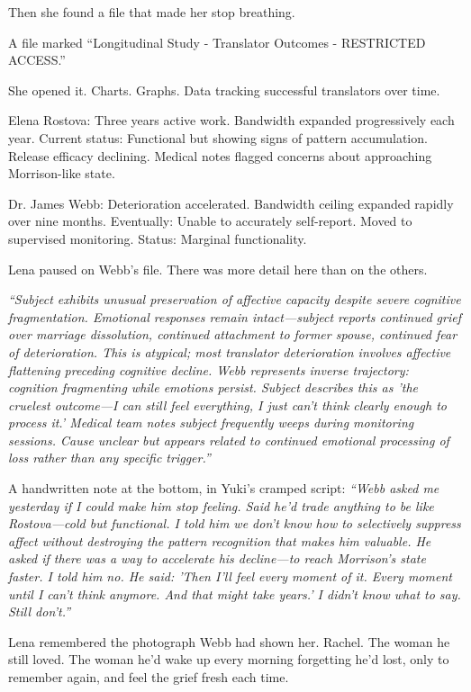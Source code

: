Then she found a file that made her stop breathing.

A file marked ``Longitudinal Study - Translator Outcomes - RESTRICTED ACCESS.''

She opened it. Charts. Graphs. Data tracking successful translators over time.

Elena Rostova: Three years active work. Bandwidth expanded progressively each year. Current status: Functional but showing signs of pattern accumulation. Release efficacy declining. Medical notes flagged concerns about approaching Morrison-like state.

Dr. James Webb: Deterioration accelerated. Bandwidth ceiling expanded rapidly over nine months. Eventually: Unable to accurately self-report. Moved to supervised monitoring. Status: Marginal functionality.

Lena paused on Webb's file. There was more detail here than on the others.

\textit{``Subject exhibits unusual preservation of affective capacity despite severe cognitive fragmentation. Emotional responses remain intact—subject reports continued grief over marriage dissolution, continued attachment to former spouse, continued fear of deterioration. This is atypical; most translator deterioration involves affective flattening preceding cognitive decline. Webb represents inverse trajectory: cognition fragmenting while emotions persist. Subject describes this as 'the cruelest outcome—I can still feel everything, I just can't think clearly enough to process it.' Medical team notes subject frequently weeps during monitoring sessions. Cause unclear but appears related to continued emotional processing of loss rather than any specific trigger.''}

A handwritten note at the bottom, in Yuki's cramped script: \textit{``Webb asked me yesterday if I could make him stop feeling. Said he'd trade anything to be like Rostova—cold but functional. I told him we don't know how to selectively suppress affect without destroying the pattern recognition that makes him valuable. He asked if there was a way to accelerate his decline—to reach Morrison's state faster. I told him no. He said: 'Then I'll feel every moment of it. Every moment until I can't think anymore. And that might take years.' I didn't know what to say. Still don't.''}

Lena remembered the photograph Webb had shown her. Rachel. The woman he still loved. The woman he'd wake up every morning forgetting he'd lost, only to remember again, and feel the grief fresh each time.

